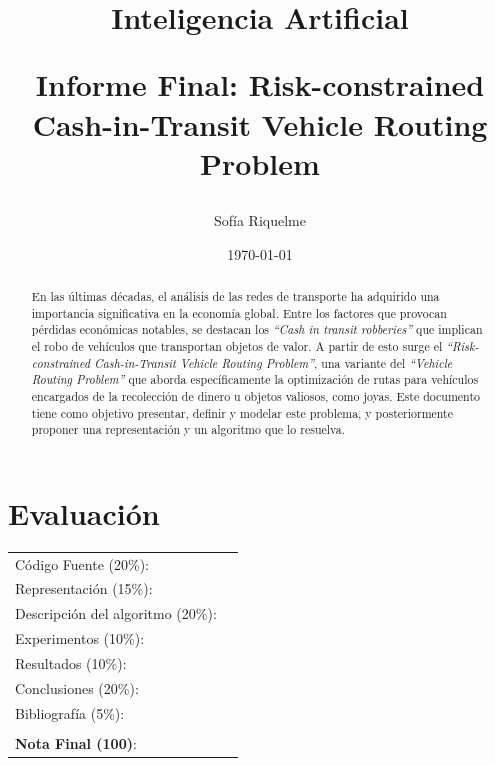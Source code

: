 \documentclass{article}
\begin{document}
\title{Inteligencia Artificial \\ \begin{Large}Informe Final: Risk-constrained Cash-in-Transit Vehicle Routing Problem\end{Large}}
\author{Sofía Riquelme}
\date{\today}
\maketitle


\section*{Evaluaci\'on}

\begin{tabular}{ll}
C\'odigo Fuente (20\%): &  \underline{\hspace{2cm}}\\
Representaci\'on (15\%):  & \underline{\hspace{2cm}} \\
Descripci\'on del algoritmo (20\%):  & \underline{\hspace{2cm}} \\
Experimentos (10\%):  & \underline{\hspace{2cm}} \\
Resultados (10\%):  & \underline{\hspace{2cm}} \\
Conclusiones (20\%): &  \underline{\hspace{2cm}}\\
Bibliograf\'ia (5\%): & \underline{\hspace{2cm}}\\
 &  \\
\textbf{Nota Final (100)}:   & \underline{\hspace{2cm}}
\end{tabular}

\begin{abstract}
    En las últimas décadas, el análisis de las redes de transporte ha adquirido una importancia significativa en la economía global. Entre los factores que provocan pérdidas económicas notables, se destacan los \textit{``Cash in transit robberies''} que implican el robo de vehículos que transportan objetos de valor. A partir de esto surge el \textit{``Risk-constrained Cash-in-Transit Vehicle Routing Problem''}, una variante del \textit{``Vehicle Routing Problem''} que aborda específicamente la optimización de rutas para vehículos encargados de la recolección de dinero u objetos valiosos, como joyas. Este documento tiene como objetivo presentar, definir y modelar este problema, y posteriormente proponer una representación y un algoritmo que lo resuelva.
\end{abstract}
\end{document}
